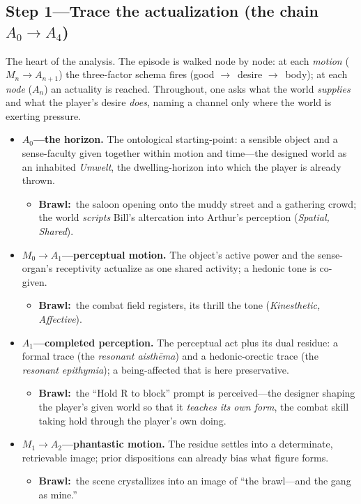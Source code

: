\documentclass[11pt]{article}
\newcommand{\inb}{\textbf{Brawl:}~}
\newcommand{\too}{\ensuremath{\to}}
\begin{document}
\subsection*{Step 1---Trace the actualization (the chain $A_0\too A_4$)}
\noindent The heart of the analysis. The episode is walked node by node: at each \emph{motion} ($M_n\too A_{n+1}$) the three-factor schema fires (good \too\ desire \too\ body); at each \emph{node} ($A_n$) an actuality is reached. Throughout, one asks what the world \emph{supplies} and what the player's desire \emph{does}, naming a channel only where the world is exerting pressure.
\begin{itemize}
  \item \textbf{$A_0$---the horizon.} The ontological starting-point: a sensible object and a sense-faculty given together within motion and time---the designed world as an inhabited \textit{Umwelt}, the dwelling-horizon into which the player is already thrown.
    \begin{itemize}\item \inb the saloon opening onto the muddy street and a gathering crowd; the world \emph{scripts} Bill's altercation into Arthur's perception (\emph{Spatial, Shared}).\end{itemize}
  \item \textbf{$M_0\too A_1$---perceptual motion.} The object's active power and the sense-organ's receptivity actualize as one shared activity; a hedonic tone is co-given.
    \begin{itemize}\item \inb the combat field registers, its thrill the tone (\emph{Kinesthetic, Affective}).\end{itemize}
  \item \textbf{$A_1$---completed perception.} The perceptual act plus its dual residue: a formal trace (the \emph{resonant aisth\=ema}) and a hedonic-orectic trace (the \emph{resonant epithymia}); a being-affected that is here preservative.
    \begin{itemize}\item \inb the ``Hold R to block'' prompt is perceived---the designer shaping the player's given world so that it \emph{teaches its own form}, the combat skill taking hold through the player's own doing.\end{itemize}
  \item \textbf{$M_1\too A_2$---phantastic motion.} The residue settles into a determinate, retrievable image; prior dispositions can already bias what figure forms.
    \begin{itemize}\item \inb the scene crystallizes into an image of ``the brawl---and the gang as mine.''\end{itemize}

\end{itemize}
\end{document}
